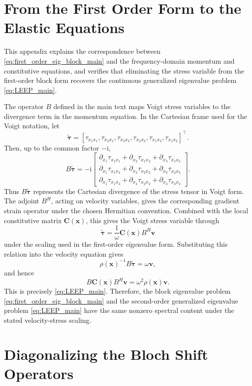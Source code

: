 \documentclass[11pt,oneside]{article}
\numberwithin{equation}{section}
\theoremstyle{plain}
\theoremstyle{remark}
\begin{document}
\appendix

\section{From the First Order Form to the Elastic Equations}
\label{app:block_verify}

This appendix explains the correspondence between \eqref{eq:first_order_eig_block_main} and the frequency-domain momentum and constitutive equations, and verifies that eliminating the stress variable from the first-order block form recovers the continuous generalized eigenvalue problem \eqref{eq:LEEP_main}.

The operator \(B\) defined in the main text maps Voigt stress variables to the divergence term in the momentum equation. In the Cartesian frame used for the Voigt notation, let
\[
\widetilde{\bm\tau}=
[\tau_{x_1x_1},\tau_{x_2x_2},\tau_{x_3x_3},
\tau_{x_2x_3},\tau_{x_1x_3},\tau_{x_1x_2}]^\top.
\]
Then, up to the common factor \(-\mathrm i\),
\[
B\widetilde{\bm\tau}
=
-\mathrm i
\begin{bmatrix}
\partial_{x_1}\tau_{x_1x_1}
+\partial_{x_2}\tau_{x_1x_2}
+\partial_{x_3}\tau_{x_1x_3}\\
\partial_{x_1}\tau_{x_1x_2}
+\partial_{x_2}\tau_{x_2x_2}
+\partial_{x_3}\tau_{x_2x_3}\\
\partial_{x_1}\tau_{x_1x_3}
+\partial_{x_2}\tau_{x_2x_3}
+\partial_{x_3}\tau_{x_3x_3}
\end{bmatrix}.
\]
Thus \(B\widetilde{\bm\tau}\) represents the Cartesian divergence of the stress tensor in Voigt form. The adjoint \(B^H\), acting on velocity variables, gives the corresponding gradient strain operator under the chosen Hermitian convention. Combined with the local constitutive matrix \(\bm C(\mathbf x)\), this gives the Voigt stress variable through
\[
\widetilde{\bm\tau}=\frac{1}{\omega}\bm C(\mathbf x)B^H\bm v
\]
under the scaling used in the first-order eigenvalue form. Substituting this relation into the velocity equation gives
\[
\rho(\mathbf x)^{-1}B\widetilde{\bm\tau}
=
\omega \bm v,
\]
and hence
\[
B\bm C(\mathbf x)B^H\bm v
=
\omega^2 \rho(\mathbf x)\bm v.
\]
This is precisely \eqref{eq:LEEP_main}. Therefore, the block eigenvalue problem \eqref{eq:first_order_eig_block_main} and the second-order generalized eigenvalue problem \eqref{eq:LEEP_main} have the same nonzero spectral content under the stated velocity-stress scaling.

\section{Diagonalizing the Bloch Shift Operators}
\label{app:K_spectrum}
\end{document}
